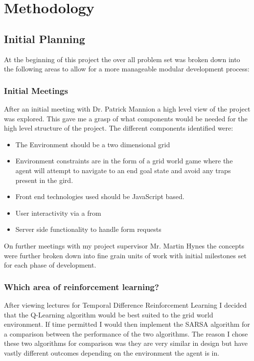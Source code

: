 \chapter{Methodology}
\section{Initial Planning}
At the beginning of this project the over all problem set was broken down into the following areas to allow for a more manageable modular development process:

\subsection {Initial Meetings}
After an initial meeting with Dr. Patrick Mannion a high level view of the project was explored. This gave me a grasp of what components would be needed for the high level structure of the project.
The different components identified were:
\begin{itemize}
	\item The Environment should be a two dimensional grid 
	\item Environment constraints are in the form of a grid world game where the agent will attempt to navigate to an end goal state and avoid any traps present in the gird.
	\item Front end technologies used should be JavaScript based.
	\item User interactivity via a from 
	\item Server side functionality to handle form requests
\end{itemize}

On further meetings with my project supervisor Mr. Martin Hynes the concepts were further broken down into fine grain units of work with initial milestones set for each phase of development.
\subsection {Which area of reinforcement learning?}
After viewing lectures for Temporal Difference Reinforcement Learning I decided that the Q-Learning algorithm would be best suited to the grid world environment. If time permitted I would then implement the SARSA algorithm for a comparison between the performance of the two algorithms.
The reason I chose these two algorithms for comparison was they are very similar in design but have vastly different outcomes depending on the environment the agent is in. 
